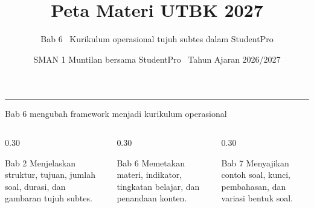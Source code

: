 \renewcommand{\currentchapter}{6}
\title{Peta Materi UTBK 2027}
\subtitle{Bab 6 \textbar\ Kurikulum operasional tujuh subtes dalam StudentPro}
\date{SMAN 1 Muntilan bersama StudentPro \textbar\ Tahun Ajaran 2026/2027}

\begingroup
{}
\begin{frame}[plain]
  \vspace{0.65cm}
  \vspace{0.08cm}
  {\color{StudentWhite}\inserttitle\par}
  \vspace{0.38cm}
  {\color{StudentSoft}\insertsubtitle\par}
  \vfill
  {\color{StudentGold}\rule{2.3cm}{2.5pt}}\par
  \vspace{0.20cm}
  {\color{StudentWhite}\insertauthor}\par
  {\color{StudentSoft}\insertdate}
  \vspace{0.42cm}
\end{frame}
\endgroup

\begin{frame}{Bab 6 mengubah framework menjadi kurikulum operasional}
  \begin{columns}[T,onlytextwidth]
    \begin{column}{0.30\textwidth}
      \begin{block}{Bab 2}
        Menjelaskan struktur, tujuan, jumlah soal, durasi, dan gambaran tujuh subtes.
      \end{block}
    \end{column}
    \begin{column}{0.30\textwidth}
      \begin{block}{Bab 6}
        Memetakan materi, indikator, tingkatan belajar, dan penandaan konten.
      \end{block}
    \end{column}
    \begin{column}{0.30\textwidth}
      \begin{block}{Bab 7}
        Menyajikan contoh soal, kunci, pembahasan, dan variasi bentuk soal.
      \end{block}
    \end{column}
  \end{columns}
  \vspace{0.26cm}
\end{frame}

